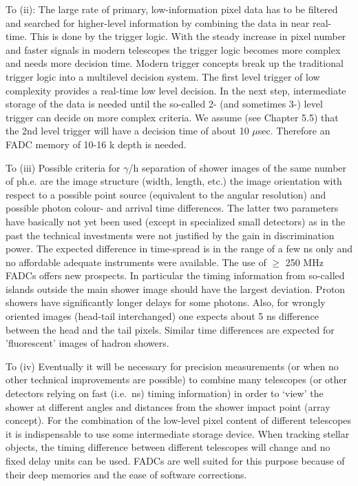 To (ii): The large rate of primary, low-information pixel data has to be
filtered and searched for higher-level information by combining the data in
near real-time. This is done by the trigger logic. With the steady increase
in pixel number and faster signals in modern telescopes the trigger logic
becomes more complex and needs more decision time. Modern trigger concepts
break up the traditional trigger logic into a multilevel decision system.
The first level trigger of low complexity provides a real-time low level
decision. In the next step, intermediate storage of the data is needed until
the so-called 2- (and sometimes 3-) level trigger can decide on more complex
criteria. We assume (see Chapter 5.5) that the 2nd level trigger will have a
decision time of about 10 $\mu$sec. Therefore an FADC memory of 10-16 k
depth is needed.

To (iii) Possible criteria for $\gamma $/h separation of shower images of the
same number of ph.e. are the image structure (width, length, etc.) the image
orientation with respect to a possible point source (equivalent to the
angular resolution) and possible photon colour- and arrival time
differences. The latter two parameters have basically not yet been used
(except in specialized small detectors) as in the past the technical
investments were not justified by the gain in discrimination power. The
expected difference in time-spread is in the range of a few ns only and no
affordable adequate instruments were available. The use of $\geq $ 250 MHz
FADCs offers new prospects. In particular the timing information from
so-called islands outside the main shower image should have the largest
deviation. Proton showers have significantly longer delays for some photons.
Also, for wrongly oriented images (head-tail interchanged) one expects about
5 ns difference between the head and the tail pixels. Similar time differences are expected
for 'fluorescent' images of hadron showers.

To (iv) Eventually it will be necessary for precision measurements (or when
no other technical improvements are possible) to combine many telescopes (or
other detectors relying on fast (i.e.\ ns) timing information) in order to `view' the
shower at different angles and distances from the shower impact point (array
concept). For the combination of the low-level pixel content of different
telescopes it is indispensable to use some intermediate storage device. When
tracking stellar objects, the timing difference between different telescopes
will change and no fixed delay units can be used. FADCs are well suited for
this purpose because of their deep memories and the ease of software corrections.

